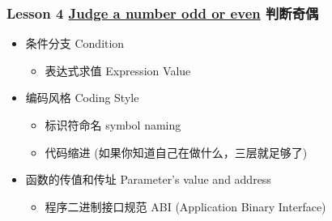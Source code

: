 \begin{frame}\frametitle{Lesson 4 \href{Lesson-4.md}{Judge a number odd
or even} 判断奇偶}

\begin{itemize}
\item
  条件分支 Condition
  \begin{itemize}
  \item
    表达式求值 Expression Value
  \end{itemize}
\item
  编码风格 Coding Style
  \begin{itemize}
  \item
    标识符命名 symbol naming
  \item
    代码缩进 (如果你知道自己在做什么，三层就足够了)
  \end{itemize}
\item
  函数的传值和传址 Parameter's value and address
  \begin{itemize}
  \item
    程序二进制接口规范 ABI (Application Binary Interface)
  \end{itemize}
\end{itemize}
\end{frame}
